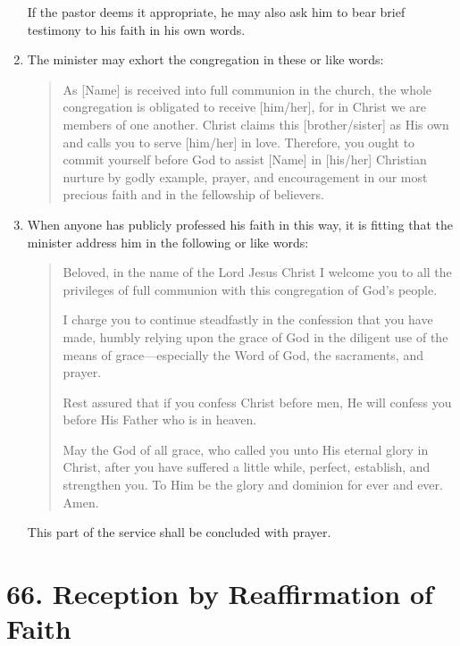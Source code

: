 \documentclass[
]{book}
\begin{document}
\begin{enumerate}
  If the pastor deems it appropriate, he may also ask him to bear brief testimony to his faith in his own words.
\item
  The minister may exhort the congregation in these or like words:

  \begin{quote}
  As {[}Name{]} is received into full communion in the church, the whole congregation is obligated to receive {[}him/her{]}, for in Christ we are members of one another. Christ claims this {[}brother/sister{]} as His own and calls you to serve {[}him/her{]} in love. Therefore, you ought to commit yourself before God to assist {[}Name{]} in {[}his/her{]} Christian nurture by godly example, prayer, and encouragement in our most precious faith and in the fellowship of believers.
  \end{quote}
\item
  \protect\hypertarget{65.4}{\href{}{}}When anyone has publicly professed his faith in this way, it is fitting that the minister address him in the following or like words:

  \begin{quote}
  Beloved, in the name of the Lord Jesus Christ I welcome you to all the privileges of full communion with this congregation of God's people.

  I charge you to continue steadfastly in the confession that you have made, humbly relying upon the grace of God in the diligent use of the means of grace---especially the Word of God, the sacraments, and prayer.

  Rest assured that if you confess Christ before men, He will confess you before His Father who is in heaven.

  May the God of all grace, who called you unto His eternal glory in Christ, after you have suffered a little while, perfect, establish, and strengthen you. To Him be the glory and dominion for ever and ever. Amen.
  \end{quote}

  This part of the service shall be concluded with prayer.
\end{enumerate}

\hypertarget{reception-by-reaffirmation-of-faith}{%
\section*{66. Reception by Reaffirmation of Faith}\label{reception-by-reaffirmation-of-faith}}
\end{document}
